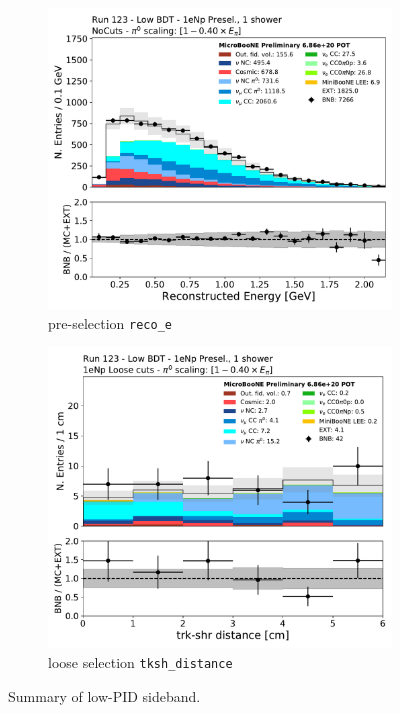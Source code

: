 \begin{figure}[H]
    \begin{center}
    \begin{subfigure}{0.45\textwidth}
    \includegraphics[width=1.00\textwidth]{Sidebands/Figures/1eNp/LPID_NPOneShr_None_pi0e40/reco_e.pdf}
    \caption{\label{fig:LPID_1eNp_reco_e} pre-selection \texttt{reco\_e}}
    \end{subfigure}
    \begin{subfigure}{0.45\textwidth}
    \includegraphics[width=1.00\textwidth]{Sidebands/Figures/1eNp/LPID_NPOneShr_None_pi0e40/tksh_distance_LPID.pdf}
    \caption{\label{fig:LPID_1eNp_tkshdist} loose selection \texttt{tksh\_distance}}
    \end{subfigure}
    \caption{Summary of \npsel low-PID sideband.}
    \end{center}
\end{figure}

